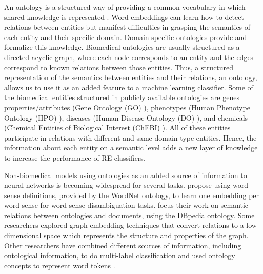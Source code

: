 An ontology is a structured way of providing a common vocabulary in which shared knowledge is represented \citep{gruber1993translation}. Word embeddings can learn how to detect relations between entities but manifest difficulties in grasping the semantics of each entity and their specific domain. Domain-specific ontologies provide and formalize this knowledge. Biomedical ontologies are usually structured as a directed acyclic graph, where each node corresponds to an entity and the edges correspond to known relations between those entities. Thus, a structured representation of the semantics between entities and their relations, an ontology, allows us to use it as an added feature to a machine learning classifier. Some of the biomedical entities structured in publicly available ontologies are genes properties/attributes (Gene Ontology (GO) \citep{ashburner2000gene}), phenotypes (Human Phenotype Ontology (HPO) \citep{robinson2010human}), diseases (Human Disease Ontology (DO) \citep{schriml2012disease}), and chemicals (Chemical Entities of Biological Interest (ChEBI) \citep{hastings2016chebi}). All of these entities participate in relations with different and same domain type entities. Hence, the information about each entity on a semantic level adds a new layer of knowledge to increase the performance of RE classifiers. 

Non-biomedical models using ontologies as an added source of information to neural networks is becoming widespread for several tasks. \cite{li2016learning} propose using word sense definitions, provided by the WordNet ontology, to learn one embedding per word sense for word sense disambiguation tasks. \cite{ma2017ontology} focus their work on semantic relations between ontologies and documents, using the DBpedia ontology. Some researchers explored graph embedding techniques \citep{goyal2018graph} that convert relations to a low dimensional space which represents the structure and properties of the graph. Other researchers have combined different sources of information, including ontological information, to do multi-label classification \citep{kong2013multi} and used ontology concepts to represent word tokens \citep{dasigi2017ontology}.

